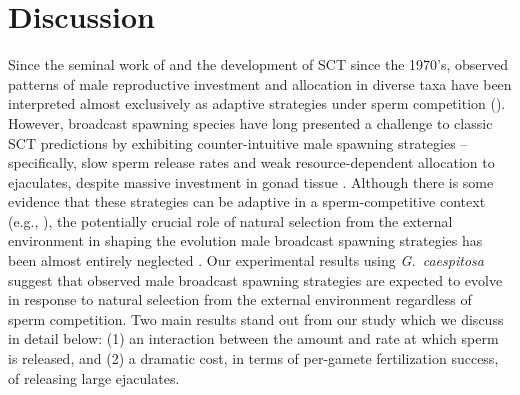 \documentclass{article}
\begin{document}
\section*{Discussion}

Since the seminal work of \citet{Bateman1948} and the development of SCT since the 1970's, observed patterns of male reproductive investment and allocation in diverse taxa have been interpreted almost exclusively as adaptive strategies under sperm competition (\citealt{Parker1972,Parker1982,Wedell2002}). However, broadcast spawning species have long presented a challenge to classic SCT predictions by exhibiting counter-intuitive male spawning strategies -- specifically, slow sperm release rates and weak resource-dependent allocation to ejaculates, despite massive investment in gonad tissue \citep{McEuan1988, MarshallBolton2007, Styan2003, Olito2015}. Although there is some evidence that these strategies can be adaptive in a sperm-competitive context (e.g., \citealt{BodeMarshall2007,Olito2015,Olito2017,LotterhosLevitan2011}), the potentially crucial role of natural selection from the external environment in shaping the evolution male broadcast spawning strategies has been almost entirely neglected \citep{MarshallBolton2007}. Our experimental results using \textit{G.~caespitosa} suggest that observed male broadcast spawning strategies are expected to evolve in response to natural selection from the external environment regardless of sperm competition. Two main results stand out from our study which we discuss in detail below: (1) an interaction between the amount and rate at which sperm is released, and (2) a dramatic cost, in terms of per-gamete fertilization success, of releasing large ejaculates.
\end{document}
